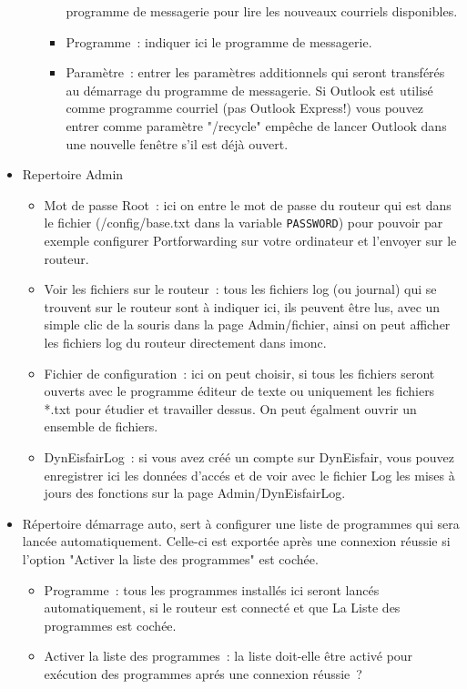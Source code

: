 \begin{itemize}
\begin{itemize}
\begin{itemize}
            programme de messagerie pour lire les nouveaux courriels disponibles.
         \item Programme~: indiquer ici le programme de messagerie.
         \item Paramètre~: entrer les paramètres additionnels qui seront transférés
            au démarrage du programme de messagerie. Si Outlook est utilisé comme
            programme courriel (pas Outlook Express!) vous pouvez entrer comme paramètre
            "/recycle" empêche de lancer Outlook dans une nouvelle fenêtre s'il est
            déjà ouvert.
      \end{itemize}
    \end{itemize}

  \item Repertoire Admin
    \begin{itemize}
      \item Mot de passe Root~: ici on entre le mot de passe du routeur qui est
        dans le fichier (/config/base.txt dans la variable \verb+PASSWORD+) pour pouvoir
        par exemple configurer Portforwarding sur votre ordinateur et l'envoyer
        sur le routeur.
      \item Voir les fichiers sur le routeur~: tous les fichiers log (ou journal)
        qui se trouvent sur le routeur sont à indiquer ici, ils peuvent être lus,
        avec un simple clic de la souris dans la page Admin/fichier, ainsi on peut
        afficher les fichiers log du routeur directement dans imonc.
      \item Fichier de configuration~: ici on peut choisir, si tous les fichiers
        seront ouverts avec le programme éditeur de texte ou uniquement les fichiers
        *.txt pour étudier et travailler dessus. On peut égalment ouvrir un ensemble
        de fichiers.
      \item DynEisfairLog~: si vous avez créé un compte sur DynEisfair, vous pouvez
        enregistrer ici les données d'accés et de voir avec le fichier Log les mises
        à jours des fonctions sur la page Admin/DynEisfairLog.
    \end{itemize}

  \item Répertoire démarrage auto, sert à configurer une liste de programmes qui
    sera lancée automatiquement. Celle-ci est exportée après une connexion réussie
    si l'option "Activer la liste des programmes" est cochée.
    \begin{itemize}
      \item Programme~: tous les programmes installés ici seront lancés
        automatiquement, si le routeur est connecté et que La Liste des
        programmes est cochée.
      \item Activer la liste des programmes~: la liste doit-elle être activé pour
        exécution des programmes aprés une connexion réussie~?
    \end{itemize}


\end{itemize}
